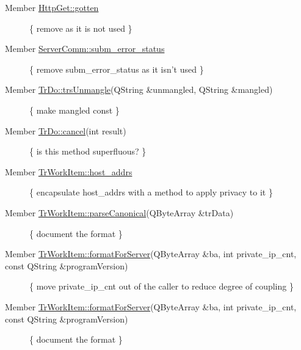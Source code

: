 \label{todo__todo000001}
\hypertarget{todo__todo000001}{}
 \begin{description}
\item[Member \hyperlink{classHttpGet_f807ab4073ff2e604bb3aea0cc2e121d}{HttpGet::gotten} ]\{ remove as it is not used \} \end{description}


\label{todo__todo000002}
\hypertarget{todo__todo000002}{}
 \begin{description}
\item[Member \hyperlink{classServerComm_060b1a2c01b923b17dc8d9d3236be5a1}{ServerComm::subm\_\-error\_\-status} ]\{ remove subm\_\-error\_\-status as it isn't used \} \end{description}


\label{todo__todo000003}
\hypertarget{todo__todo000003}{}
 \begin{description}
\item[Member \hyperlink{classTrDo_3bbf80bc98ceb20339ff0497c99ba199}{TrDo::trsUnmangle}(QString \&unmangled, QString \&mangled) ]\{ make mangled const \} \end{description}


\label{todo__todo000004}
\hypertarget{todo__todo000004}{}
 \begin{description}
\item[Member \hyperlink{classTrDo_f4e4e8f6848183014a157605bc9c402a}{TrDo::cancel}(int result) ]\{ is this method superfluous? \} \end{description}


\label{todo__todo000008}
\hypertarget{todo__todo000008}{}
 \begin{description}
\item[Member \hyperlink{classTrWorkItem_bec5a48d1d5cf74bb01453ab708e4aeb}{TrWorkItem::host\_\-addrs} ]\{ encapsulate host\_\-addrs with a method to apply privacy to it \} \end{description}


\label{todo__todo000005}
\hypertarget{todo__todo000005}{}
 \begin{description}
\item[Member \hyperlink{classTrWorkItem_9410f63d30b40f24b452243f1f5f0a48}{TrWorkItem::parseCanonical}(QByteArray \&trData) ]\{ document the format \} \end{description}


\label{todo__todo000006}
\hypertarget{todo__todo000006}{}
 \begin{description}
\item[Member \hyperlink{classTrWorkItem_5e3ff6cc58c4411661b93e4280613b43}{TrWorkItem::formatForServer}(QByteArray \&ba, int private\_\-ip\_\-cnt, const QString \&programVersion) ]\{ move private\_\-ip\_\-cnt out of the caller to reduce degree of coupling \} \end{description}


\label{todo__todo000006}
\hypertarget{todo__todo000006}{}
 \begin{description}
\item[Member \hyperlink{classTrWorkItem_5e3ff6cc58c4411661b93e4280613b43}{TrWorkItem::formatForServer}(QByteArray \&ba, int private\_\-ip\_\-cnt, const QString \&programVersion) ]\{ document the format \} \end{description}
